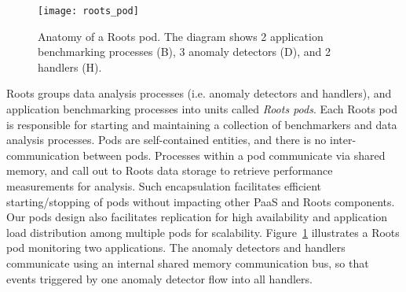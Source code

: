\begin{figure}
\centering
\texttt{[image: roots\_pod]}
\caption{Anatomy of a Roots pod. The diagram shows 2 application benchmarking processes (B), 
3 anomaly detectors (D), and 2 handlers (H).}
\label{fig:roots_pod}
\end{figure}

Roots groups data analysis processes (i.e. anomaly detectors and handlers), 
and application benchmarking processes into units called \textit{Roots pods}. 
Each Roots pod is responsible for starting and maintaining a collection of
benchmarkers and data analysis processes. 
Pods are self-contained entities, and there is no inter-communication
between pods. 
Processes within a pod communicate via 
shared memory, and call out to Roots data storage to retrieve 
performance measurements for analysis. Such encapsulation facilitates 
efficient starting/stopping of pods 
without impacting other PaaS and Roots components. Our pods design also facilitates
replication for high availability and application load distribution
among multiple pods for scalability.
Figure~\ref{fig:roots_pod} illustrates a Roots pod monitoring two applications.
The anomaly detectors and handlers communicate
using an internal shared memory communication bus, so that events triggered by one anomaly
detector flow into all handlers. 

